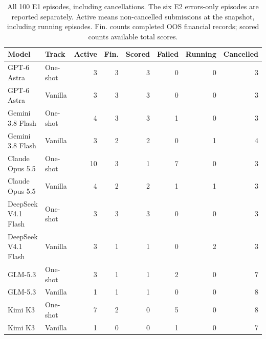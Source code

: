 \begin{table}[htbp]
\centering
\footnotesize
\caption{All 100 E1 episodes, including cancellations. The six E2 errors-only episodes are reported separately. Active means non-cancelled submissions at the snapshot, including running episodes. Fin. counts completed OOS financial records; scored counts available total scores.}
\label{tab:run_status}
\setlength{\tabcolsep}{3pt}
\begin{tabular}{@{}llrrrrrr@{}}
\toprule
Model & Track & Active & Fin. & Scored & Failed & Running & Cancelled \\
\midrule
GPT-6 Astra & One-shot & 3 & 3 & 3 & 0 & 0 & 3 \\
GPT-6 Astra & Vanilla & 3 & 3 & 3 & 0 & 0 & 3 \\
Gemini 3.8 Flash & One-shot & 4 & 3 & 3 & 1 & 0 & 3 \\
Gemini 3.8 Flash & Vanilla & 3 & 2 & 2 & 0 & 1 & 4 \\
Claude Opus 5.5 & One-shot & 10 & 3 & 1 & 7 & 0 & 3 \\
Claude Opus 5.5 & Vanilla & 4 & 2 & 2 & 1 & 1 & 3 \\
DeepSeek V4.1 Flash & One-shot & 3 & 3 & 3 & 0 & 0 & 3 \\
DeepSeek V4.1 Flash & Vanilla & 3 & 1 & 1 & 0 & 2 & 3 \\
GLM-5.3 & One-shot & 3 & 1 & 1 & 2 & 0 & 7 \\
GLM-5.3 & Vanilla & 1 & 1 & 1 & 0 & 0 & 8 \\
Kimi K3 & One-shot & 7 & 2 & 0 & 5 & 0 & 8 \\
Kimi K3 & Vanilla & 1 & 0 & 0 & 1 & 0 & 7 \\
\bottomrule
\end{tabular}
\end{table}
